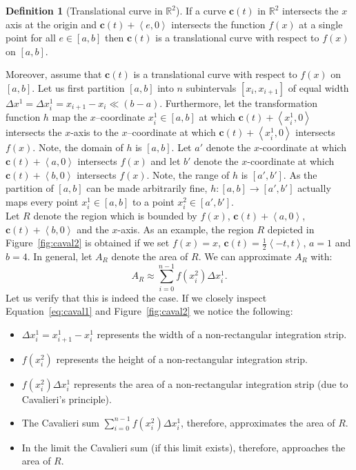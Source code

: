 \documentclass{article}
\theoremstyle{theorem}
\theoremstyle{definition}
\newtheorem*{definition}{Definition}
\begin{document}
\begin{definition}[Translational curve in $\mathbb{R}^2$]
If a curve $\mathbf{c}(t)$ in $\mathbb{R}^2$ intersects the $x$ axis at the origin and $\mathbf{c}(t) + \left < e,0 \right >$ intersects 
the function $f(x)$ at a single point for all $e\in [a,b]$ then $\mathbf{c}(t)$ is a translational curve 
with respect to $f(x)$ on $[a,b]$. 
\end{definition}

\noindent
Moreover, assume that $\mathbf{c}(t)$ is a translational curve with respect to $f(x)$ on $[a,b]$. Let us first partition $[a,b]$ into $n$ subintervals $[x_{i},x_{i+1}]$ of equal 
width $\Delta x^1 = \Delta x_i^1 = x_{i+1}-x_i\ll (b-a)$. Furthermore, let the transformation function $h$ map the $x$--coordinate $x_i^1\in [a,b]$ at which $\mathbf{c}(t) + \left <x_i^1,0 \right >$ intersects the 
$x$-axis to the $x$--coordinate at which $\mathbf{c}(t) + \left <x_i^1,0 \right >$ intersects $f(x)$. Note, the domain of $h$ is $[a,b]$. Let $a'$ denote the $x$-coordinate 
at which $\mathbf{c}(t) + \left <a,0 \right >$ intersects $f(x)$ and let $b'$ denote the $x$-coordinate 
at which $\mathbf{c}(t) + \left <b,0 \right >$ intersects $f(x)$.  Note, the range 
of $h$ is $[a',b']$. As the partition of $[a,b]$ can be made arbitrarily fine, $h:[a,b]\rightarrow [a',b']$ actually maps every point $x_i^1\in [a,b]$ to a point $x_i^2\in [a',b']$. \\

\noindent
Let $R$ denote the region which is bounded by $f(x)$, $\mathbf{c}(t)+\left <a,0\right >$, $\mathbf{c}(t)+\left <b,0\right >$ and the $x$-axis. 
As an example, the region $R$ depicted in Figure~\ref{fig:caval2} is obtained if we set $f(x) = x$, $\mathbf{c}(t) = \frac{1}{2}\left<- t, t\right>$, $a = 1$ and $b = 4$.
In general, let $A_R$ denote the area of $R$. We can approximate $A_R$ with:
\begin{equation}
 \label{eq:caval1}
 A_R \approx \sum_{i=0}^{n-1} f(x_i^2)\Delta x_i^1.
 \end{equation}
Let us verify that this is indeed the case. If we closely inspect Equation~\ref{eq:caval1} and Figure~\ref{fig:caval2} we notice the following:
 \begin{itemize}
  \item $\Delta x_i^1 = x_{i+1}^1 - x_i^1$ represents the width of a non-rectangular integration strip.
  \item $f(x_i^2)$ represents the height of a non-rectangular integration strip.
  \item $f(x_i^2)\Delta x_i^1$ represents the area of a non-rectangular integration strip (due to Cavalieri's principle).
  \item The Cavalieri sum $\sum_{i=0}^{n-1} f(x_i^2)\Delta x_i^1$, therefore, approximates the area of $R$.
  \item In the limit the Cavalieri sum (if this limit exists), therefore, approaches the area of $R$.
 \end{itemize}
\end{document}
